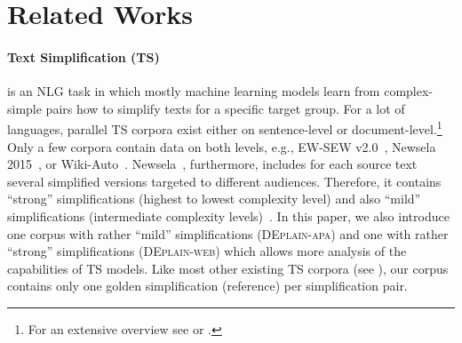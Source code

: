\documentclass[11pt]{article}
\begin{document}
\section{Related Works}
\paragraph{Text Simplification (TS)} is an NLG task in which mostly machine learning models learn from complex-simple pairs how to simplify texts for a specific target group. For a lot of languages, parallel TS corpora exist either on sentence-level or document-level.\footnote{For an extensive overview see \citet{stajner-2021-automatic-repaired} or \citet{Trienes-etal-2023-datasets}.} Only a few corpora contain data on both levels, e.g., EW-SEW v2.0~\cite{kauchak-2013-improving}, Newsela 2015~\cite{xu-etal-2015-problems}, or Wiki-Auto~\cite{jiang-etal-2020-neural}. Newsela~\cite{xu-etal-2015-problems}, furthermore, includes for each source text several simplified versions targeted to different audiences. Therefore, it contains ``strong'' simplifications (highest to lowest complexity level) and also ``mild'' simplifications (intermediate complexity levels)~\cite{stajner-etal-2017-sentence}. In this paper, we also introduce one corpus with rather ``mild'' simplifications (\textsc{DEplain-apa}) and one with rather ``strong'' simplifications (\textsc{DEplain-web}) which allows more analysis of the capabilities of TS models.
Like most other existing TS corpora (see \citealt{Trienes-etal-2023-datasets}), our corpus contains only one golden simplification (reference) per simplification pair.
\end{document}

